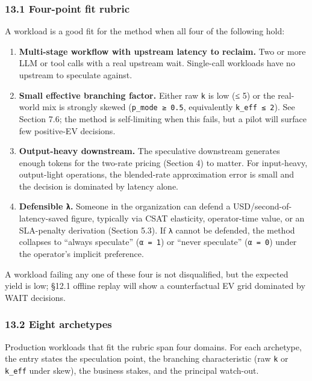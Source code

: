 \documentclass[
  11pt,
]{article}
\providecommand{\tightlist}{%
  \setlength{\itemsep}{0pt}\setlength{\parskip}{0pt}}
\begin{document}
\subsubsection{13.1 Four-point fit rubric}\label{four-point-fit-rubric}

A workload is a good fit for the method when all four of the following
hold:

\begin{enumerate}
\def\labelenumi{\arabic{enumi}.}
\tightlist
\item
  \textbf{Multi-stage workflow with upstream latency to reclaim.} Two or
  more LLM or tool calls with a real upstream wait. Single-call
  workloads have no upstream to speculate against.
\item
  \textbf{Small effective branching factor.} Either raw \texttt{k} is
  low (≤ 5) or the real-world mix is strongly skewed
  (\texttt{p\_mode\ ≥\ 0.5}, equivalently \texttt{k\_eff\ ≤\ 2}). See
  Section 7.6; the method is self-limiting when this fails, but a pilot
  will surface few positive-EV decisions.
\item
  \textbf{Output-heavy downstream.} The speculative downstream generates
  enough tokens for the two-rate pricing (Section 4) to matter. For
  input-heavy, output-light operations, the blended-rate approximation
  error is small and the decision is dominated by latency alone.
\item
  \textbf{Defensible \texttt{λ}.} Someone in the organization can defend
  a USD/second-of-latency-saved figure, typically via CSAT elasticity,
  operator-time value, or an SLA-penalty derivation (Section 5.3). If
  \texttt{λ} cannot be defended, the method collapses to ``always
  speculate'' (\texttt{α\ =\ 1}) or ``never speculate''
  (\texttt{α\ =\ 0}) under the operator's implicit preference.
\end{enumerate}

A workload failing any one of these four is not disqualified, but the
expected yield is low; §12.1 offline replay will show a counterfactual
EV grid dominated by WAIT decisions.

\subsubsection{13.2 Eight archetypes}\label{eight-archetypes}

Production workloads that fit the rubric span four domains. For each
archetype, the entry states the speculation point, the branching
characteristic (raw \texttt{k} or \texttt{k\_eff} under skew), the
business stakes, and the principal watch-out.
\end{document}
